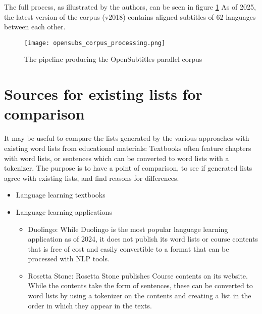 The full process, as illustrated by the authors, can be seen in figure \ref{fig:opensubs pipeline}
As of 2025, the latest version of the corpus (v2018) contains aligned subtitles of 62 languages between each other.

\begin{figure}[H]
	\centering
    \texttt{[image: opensubs\_corpus\_processing.png]}
	\caption{The pipeline producing the OpenSubtitles parallel corpus}
    \label{fig:opensubs pipeline}
\end{figure}

\section{Sources for existing lists for comparison}
It may be useful to compare the lists generated by the various approaches with existing word lists from educational materials:
Textbooks often feature chapters with word lists, or sentences which can be converted to word lists with a tokenizer.
The purpose is to have a point of comparison, to see if generated lists agree with existing lists, and find reasons for differences.

\begin{itemize}
	\item Language learning textbooks

	\item Language learning applications
	      \begin{itemize}
		      \item Duolingo: While Duolingo is the most popular language learning application as of 2024, it does not publish its word lists or course contents that is free of cost and easily convertible to a format that can be processed with NLP tools.
		      \item Rosetta Stone: Rosetta Stone publishes Course contents on its website. While the contents take the form of sentences, these can be converted to word lists by using a tokenizer on the contents and creating a list in the order in which they appear in the texts.
	      \end{itemize}
\end{itemize}


